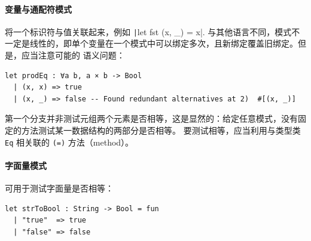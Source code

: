 \paragraph*{变量与通配符模式} 将一个标识符与值关联起来，例如 \texttt|let fst (x, _) = x|.
与其他语言不同，模式不一定是线性的，即单个变量在一个模式中可以绑定多次，且新绑定覆盖旧绑定。但是，应当注意可能的
语义问题：
\begin{verbatim}
let prodEq : ∀a b, a × b -> Bool
  | (x, x) => true
  | (x, _) => false -- Found redundant alternatives at 2)  #[(x, _)]
\end{verbatim}
第一个分支并非测试元组两个元素是否相等，这是显然的：给定任意模式，没有固定的方法测试某一数据结构的两部分是否相等。
要测试相等，应当利用与类型类 \texttt{Eq} 相关联的 \texttt{(=)} 方法（method）。

\paragraph*{字面量模式} 可用于测试字面量是否相等：
\begin{verbatim}
let strToBool : String -> Bool = fun
  | "true"  => true
  | "false" => false
\end{verbatim}
